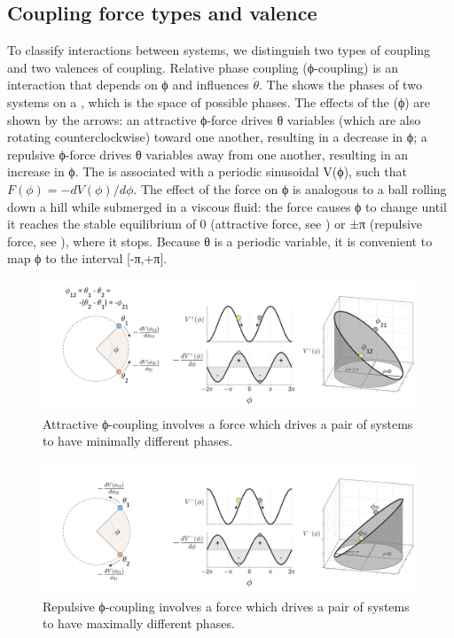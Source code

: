 \subsection{Coupling force types and valence} 

To classify interactions between systems, we distinguish two types of coupling and two valences of coupling. Relative phase coupling (ϕ-coupling) is an interaction that depends on  ϕ and influences $\dot{θ}$. The {} shows the phases of two systems on a , which is the space of possible phases. The effects of the  (ϕ)  are shown by the arrows: an attractive ϕ-force drives θ variables (which are also rotating counterclockwise) toward one another, resulting in a decrease in ϕ; a repulsive ϕ-force drives θ variables away from one another, resulting in an increase in ϕ. The  is associated with a periodic sinusoidal  V(ϕ), such that  $F(\phi)=-dV(\phi)/d\phi$. The effect of the force on ϕ is analogous to a ball rolling down a hill while submerged in a viscous fluid: the force causes ϕ to change until it reaches the stable equilibrium of 0 (attractive force, see {}) or ±π (repulsive force, see {}), where it stops. Because θ is a periodic variable, it is convenient to map ϕ to the interval [-π,+π]. 

  
\begin{figure}
\includegraphics[width=\textwidth]{figures/Tilsen-img18.png}
\caption{Attractive ϕ-coupling involves a force which drives a pair of systems to have minimally different phases.}
\label{fig:2:11}
\end{figure}
 

  
\begin{figure}
\includegraphics[width=\textwidth]{figures/Tilsen-img19.png}
\caption{Repulsive ϕ-coupling involves a force which drives a pair of systems to have maximally different phases.}
\label{fig:2:12}
\end{figure}
 

